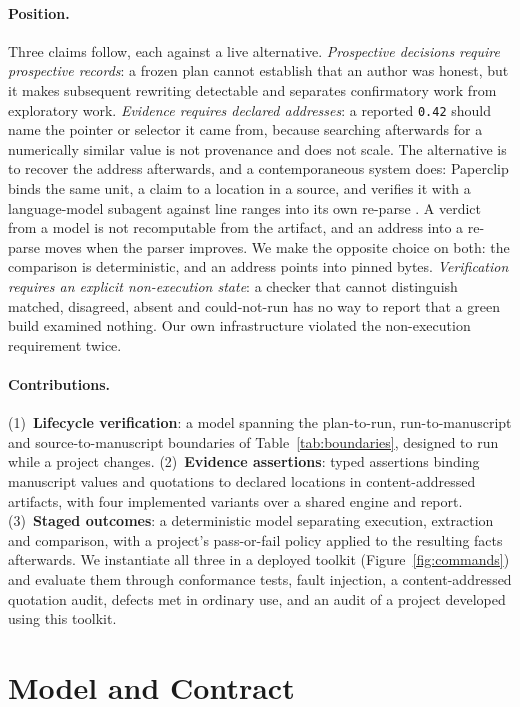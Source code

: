\documentclass{article}
\newcommand{\code}[1]{\texttt{#1}}
\begin{document}
\paragraph{Position.} Three claims follow, each against a live alternative. \emph{Prospective decisions
require prospective records}: a frozen plan cannot establish that an author was honest, but it
makes subsequent rewriting detectable and separates confirmatory work from exploratory work.
\emph{Evidence requires declared addresses}: a reported \code{0.42} should name the pointer or
selector it came from, because searching afterwards for a numerically similar value is not
provenance and does not scale. The alternative is to recover the address afterwards, and a contemporaneous system does:
Paperclip binds the same unit, a claim to a location in a source, and verifies it with a
language-model subagent against line ranges into its own re-parse \citep{gxl2026paperclip}. A
verdict from a model is not recomputable from the artifact, and an address into a re-parse moves
when the parser improves. We make the opposite choice on both: the comparison is deterministic,
and an address points into pinned bytes. \emph{Verification requires an explicit non-execution state}: a
checker that cannot distinguish matched, disagreed, absent and could-not-run has no way to report
that a green build examined nothing. Our own infrastructure violated the non-execution
requirement twice.

\paragraph{Contributions.} (1)~\textbf{Lifecycle verification}: a model spanning the
plan-to-run, run-to-manuscript and source-to-manuscript boundaries of Table~\ref{tab:boundaries},
designed to run while a project changes. (2)~\textbf{Evidence assertions}: typed assertions binding
manuscript values and quotations to declared locations in content-addressed artifacts, with four
implemented variants over a shared engine and report. (3)~\textbf{Staged outcomes}: a deterministic
model separating execution, extraction and comparison, with a project's pass-or-fail policy applied
to the resulting facts afterwards. We instantiate all three in a deployed toolkit (Figure~\ref{fig:commands}) and
evaluate them through conformance tests, fault injection, a content-addressed quotation audit,
defects met in ordinary use, and an audit of a project developed using this toolkit.


\section{Model and Contract}
\label{sec:construction}
\end{document}
